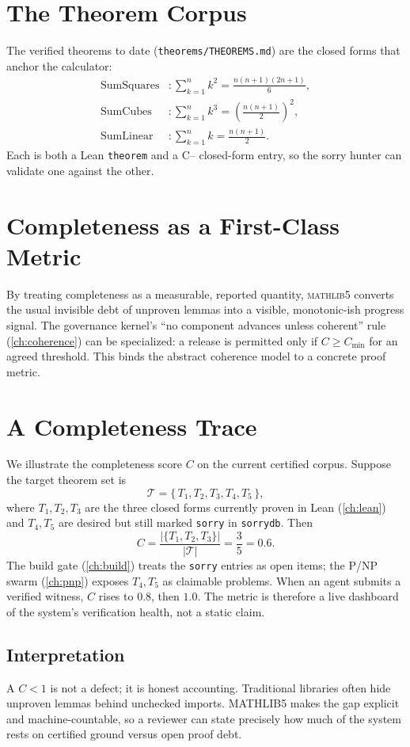 \section{The Theorem Corpus}
\label{sec:comp-theorems}

The verified theorems to date (\texttt{theorems/THEOREMS.md}) are the closed
forms that anchor the calculator:
\begin{align}
\text{SumSquares} &: \sum_{k=1}^{n} k^{2} = \frac{n(n+1)(2n+1)}{6}, \\
\text{SumCubes}   &: \sum_{k=1}^{n} k^{3} = \left(\frac{n(n+1)}{2}\right)^{2}, \\
\text{SumLinear}  &: \sum_{k=1}^{n} k   = \frac{n(n+1)}{2}.
\end{align}
Each is both a Lean \texttt{theorem} and a C{--} closed-form entry, so the
sorry hunter can validate one against the other.

\section{Completeness as a First-Class Metric}
\label{sec:comp-metric}

By treating completeness as a measurable, reported quantity, \textsc{mathlib5}
converts the usual invisible debt of unproven lemmas into a visible,
monotonic-ish progress signal. The governance kernel's ``no component advances
unless coherent'' rule (\cref{ch:coherence}) can be specialized: a release is
permitted only if $C \ge C_{\min}$ for an agreed threshold. This binds the
abstract coherence model to a concrete proof metric.

\section{A Completeness Trace}
\label{sec:comp-trace}

We illustrate the completeness score $C$ on the current certified corpus.
Suppose the target theorem set is
\[
\mathcal{T} = \{\, T_1, T_2, T_3, T_4, T_5 \,\},
\]
where $T_1,T_2,T_3$ are the three closed forms currently proven in Lean
(\cref{ch:lean}) and $T_4,T_5$ are desired but still marked
\texttt{sorry} in \texttt{sorrydb}. Then
\[
C = \frac{|\{T_1,T_2,T_3\}|}{|\mathcal{T}|} = \frac{3}{5} = 0.6.
\]
The build gate (\cref{ch:build}) treats the \texttt{sorry} entries as open
items; the P/NP swarm (\cref{ch:pnp}) exposes $T_4,T_5$ as claimable
problems. When an agent submits a verified witness, $C$ rises to $0.8$,
then $1.0$. The metric is therefore a live dashboard of the system's
verification health, not a static claim.

\subsection{Interpretation}
A $C < 1$ is not a defect; it is honest accounting. Traditional libraries
often hide unproven lemmas behind unchecked imports. MATHLIB5 makes the
gap explicit and machine-countable, so a reviewer can state precisely how
much of the system rests on certified ground versus open proof debt.
